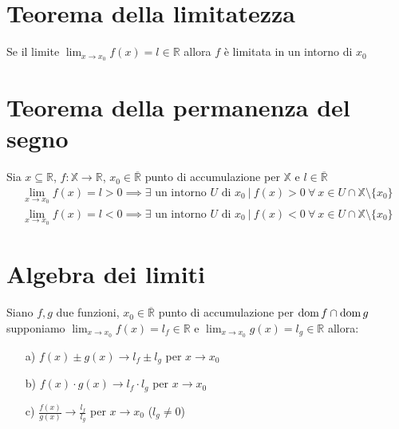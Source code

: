\section{Teorema della limitatezza}
Se il limite $\displaystyle \lim_{x \to x_0}f(x) = l \in \mathbb{R}$ allora $f$ è limitata in un intorno di $x_0$
\section{Teorema della permanenza del segno}
Sia $x \subseteq \mathbb{R}$, $f:\mathbb{X} \rightarrow \mathbb{R}$, $x_0 \in \overline{\mathbb{R}}$ punto di accumulazione per $\mathbb{X}$ e $l \in \overline{\mathbb{R}}$
\begin{equation}
\begin{split}
\displaystyle \lim_{x \to x_0}f(x) = l > 0 \implies \exists \text{ un intorno } U \text{ di } x_0\ |\ f(x)>0\ \forall\ x \in U \cap \mathbb{X} \setminus \{x_0\} \\
\lim_{x \to x_0}f(x) = l < 0 \implies \exists \text{ un intorno } U \text{ di } x_0\ |\ f(x)<0\ \forall\ x \in U \cap \mathbb{X} \setminus \{x_0\}
\end{split}
\end{equation}
\section{Algebra dei limiti}
Siano $f, g$ due funzioni, $x_0 \in \overline{\mathbb{R}}$ punto di accumulazione per $\operatorname{dom} f \cap \operatorname{dom} g$
supponiamo $\displaystyle \lim_{x \to x_0}f(x) = l_f \in \mathbb{R}$ e $\displaystyle \lim_{x \to x_0}g(x) = l_g \in \mathbb{R}$ allora:
\begin{enumerate}
\item[a)]$f(x)\pm g(x) \rightarrow l_f \pm l_g$ per $x \to x_0$
\item[b)]$f(x)\cdot g(x) \rightarrow l_f \cdot l_g$ per $x \to x_0$
\item[c)]$\frac{f(x)}{g(x)} \rightarrow \frac{l_f}{l_g}$ per $x \to x_0$ ($l_g \neq 0$)
\end{enumerate}
